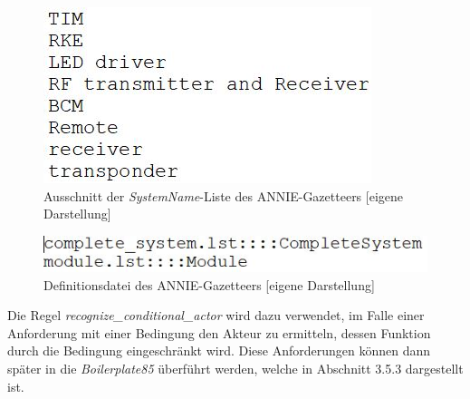 \documentclass[12pt]{report}
\begin{document}
\begin{figure}[H]
\begin{center}
\includegraphics[scale=1]{Bilder/SystemNameGazetteer.jpg}
\caption{Ausschnitt der \textit{SystemName}-Liste des ANNIE-Gazetteers [eigene Darstellung]}
\end{center}
\end{figure}

\begin{figure}[H]
\begin{center}
\includegraphics[scale=1]{Bilder/DefGazetteer.jpg}
\caption{Definitionsdatei des ANNIE-Gazetteers [eigene Darstellung]}
\end{center}
\end{figure}

Die Regel \textit{recognize\_conditional\_actor} wird dazu verwendet, im Falle einer Anforderung mit einer Bedingung den Akteur zu ermitteln, dessen Funktion durch die Bedingung eingeschränkt wird. Diese Anforderungen können dann später in die \textit{Boilerplate85} überführt werden, welche in Abschnitt 3.5.3 dargestellt ist. 
\end{document}
